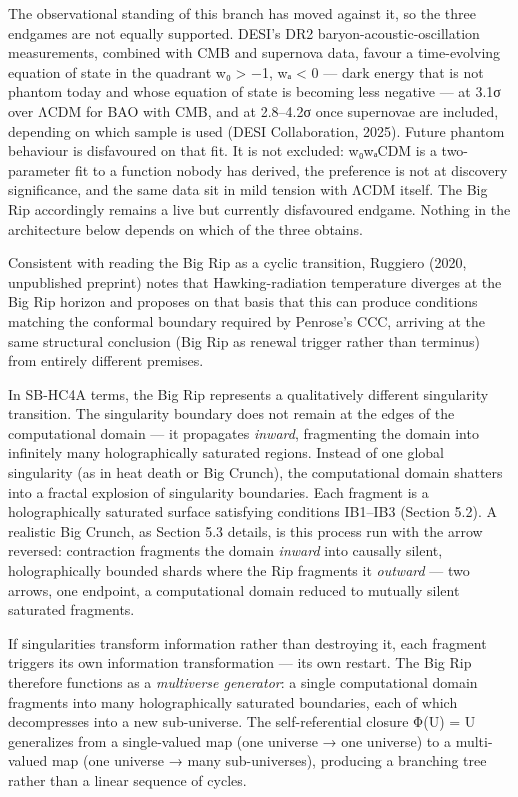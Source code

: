 \documentclass[
]{article}
\begin{document}
The observational standing of this branch has moved against it, so the
three endgames are not equally supported. DESI's DR2
baryon-acoustic-oscillation measurements, combined with CMB and
supernova data, favour a time-evolving equation of state in the quadrant
w₀ \textgreater{} −1, wₐ \textless{} 0 --- dark energy that is not
phantom today and whose equation of state is becoming less negative ---
at 3.1σ over ΛCDM for BAO with CMB, and at 2.8--4.2σ once supernovae are
included, depending on which sample is used (DESI Collaboration, 2025).
Future phantom behaviour is disfavoured on that fit. It is not excluded:
w₀wₐCDM is a two-parameter fit to a function nobody has derived, the
preference is not at discovery significance, and the same data sit in
mild tension with ΛCDM itself. The Big Rip accordingly remains a live
but currently disfavoured endgame. Nothing in the architecture below
depends on which of the three obtains.

Consistent with reading the Big Rip as a cyclic transition, Ruggiero
(2020, unpublished preprint) notes that Hawking-radiation temperature
diverges at the Big Rip horizon and proposes on that basis that this can
produce conditions matching the conformal boundary required by Penrose's
CCC, arriving at the same structural conclusion (Big Rip as renewal
trigger rather than terminus) from entirely different premises.

In SB-HC4A terms, the Big Rip represents a qualitatively different
singularity transition. The singularity boundary does not remain at the
edges of the computational domain --- it propagates \emph{inward},
fragmenting the domain into infinitely many holographically saturated
regions. Instead of one global singularity (as in heat death or Big
Crunch), the computational domain shatters into a fractal explosion of
singularity boundaries. Each fragment is a holographically saturated
surface satisfying conditions IB1--IB3 (Section 5.2). A realistic Big
Crunch, as Section 5.3 details, is this process run with the arrow
reversed: contraction fragments the domain \emph{inward} into causally
silent, holographically bounded shards where the Rip fragments it
\emph{outward} --- two arrows, one endpoint, a computational domain
reduced to mutually silent saturated fragments.

If singularities transform information rather than destroying it, each
fragment triggers its own information transformation --- its own
restart. The Big Rip therefore functions as a \emph{multiverse
generator}: a single computational domain fragments into many
holographically saturated boundaries, each of which decompresses into a
new sub-universe. The self-referential closure Φ(U) = U generalizes from
a single-valued map (one universe → one universe) to a multi-valued map
(one universe → many sub-universes), producing a branching tree rather
than a linear sequence of cycles.
\end{document}
